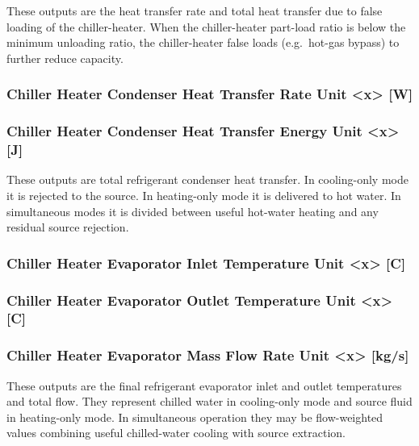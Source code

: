These outputs are the heat transfer rate and total heat transfer due to false loading of the chiller-heater. When the chiller-heater part-load ratio is below the minimum unloading ratio, the chiller-heater false loads (e.g.~hot-gas bypass) to further reduce capacity.

\subsubsection{Chiller Heater Condenser Heat Transfer Rate Unit \textless{}x\textgreater{} {[}W{]}}\label{chiller-heater-condenser-heat-transfer-rate-unit-x-w}

\subsubsection{Chiller Heater Condenser Heat Transfer Energy Unit \textless{}x\textgreater{} {[}J{]}}\label{chiller-heater-condenser-heat-transfer-energy-unit-x-j}

These outputs are total refrigerant condenser heat transfer. In cooling-only mode it is rejected to the source. In heating-only mode it is delivered to hot water. In simultaneous modes it is divided between useful hot-water heating and any residual source rejection.

\subsubsection{Chiller Heater Evaporator Inlet Temperature Unit \textless{}x\textgreater{} {[}C{]}}\label{chiller-heater-evaporator-inlet-temperature-unit-x-c}

\subsubsection{Chiller Heater Evaporator Outlet Temperature Unit \textless{}x\textgreater{} {[}C{]}}\label{chiller-heater-evaporator-outlet-temperature-unit-x-c}

\subsubsection{Chiller Heater Evaporator Mass Flow Rate Unit \textless{}x\textgreater{} {[}kg/s{]}}\label{chiller-heater-evaporator-mass-flow-rate-unit-x-kgs}

These outputs are the final refrigerant evaporator inlet and outlet temperatures and total flow. They represent chilled water in cooling-only mode and source fluid in heating-only mode. In simultaneous operation they may be flow-weighted values combining useful chilled-water cooling with source extraction.

